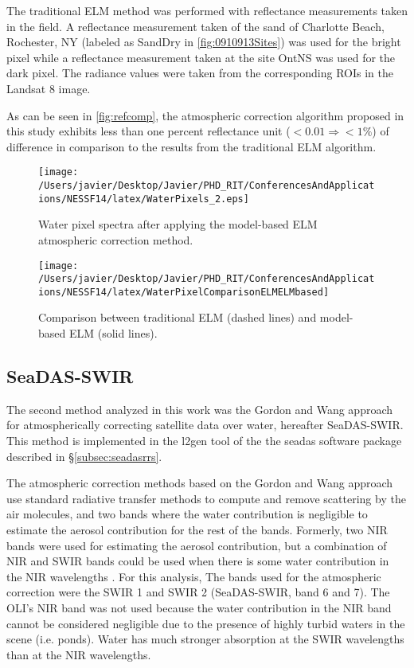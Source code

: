 The traditional ELM method was performed with reflectance measurements taken in the field. A reflectance measurement taken of the sand of Charlotte Beach, Rochester, NY (labeled as SandDry in \autoref{fig:0910913Sites}) was used for the bright pixel while a reflectance measurement taken at the site OntNS was used for the dark pixel. The radiance values were taken from the corresponding ROIs in the Landsat 8 image. 

As can be seen in \autoref{fig:refcomp}, the atmospheric correction algorithm proposed in this study exhibits less than one percent reflectance unit ($<0.01\Rightarrow <1\%$) of difference in comparison to the results from the traditional ELM algorithm.

\begin{figure}[htb]
    \centering
      \texttt{[image: /Users/javier/Desktop/Javier/PHD\_RIT/ConferencesAndApplications/NESSF14/latex/WaterPixels\_2.eps]}
      \caption{Water pixel spectra after applying the model-based ELM atmospheric correction method.}
      \label{fig:waterpxs}
\end{figure}


\begin{figure}[htb]
    \centering
      \texttt{[image: /Users/javier/Desktop/Javier/PHD\_RIT/ConferencesAndApplications/NESSF14/latex/WaterPixelComparisonELMELMbased]}
      \caption{Comparison between traditional ELM (dashed lines) and model-based ELM (solid lines).}
      \label{fig:refcomp}
\end{figure}
\subsection{SeaDAS-SWIR}
\label{subsec:seadasswir}
The second method analyzed in this work was the Gordon and Wang \cite{Gordon:1994} approach for atmospherically correcting satellite data over water, hereafter SeaDAS-SWIR. This method is implemented in the l2gen tool of the the \gls{seadas} software package described in \S\ref{subsec:seadasrrs}.


The atmospheric correction methods based on the Gordon and Wang approach use standard radiative transfer methods to compute and remove scattering by the air molecules, and two bands where the water contribution is negligible to estimate the aerosol contribution for the rest of the bands. Formerly, two NIR bands were used for estimating the aerosol contribution, but a combination of NIR and SWIR bands could be used when there is some water contribution in the NIR wavelengths \cite{Wang2009}. For this analysis, The bands used for the atmospheric correction were the SWIR 1 and SWIR 2 (SeaDAS-SWIR, band 6 and 7). The OLI's NIR band was not used because the water contribution in the NIR band cannot be considered negligible due to the presence of highly turbid waters in the scene (i.e. ponds). Water has much stronger absorption at the SWIR wavelengths than at the NIR wavelengths. 


